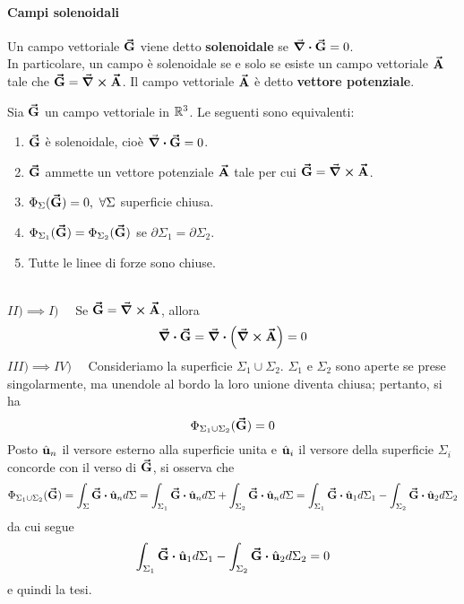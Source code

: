 \paragraph{Campi solenoidali}\label{CampoSolenoidale}
\begin{define}
	Un campo vettoriale $\vb*{\va{G}}$ viene detto \textbf{solenoidale} se $\div{\vb*{\va{G}}}=0$.\\
	In particolare, un campo è solenoidale se e solo se esiste un campo vettoriale $\vb*{\va{A}}$ tale che $\vb*{\va{G}}=\curl{\vb*{\va{A}}}$. Il campo vettoriale $\vb*{\va{A}}$ è detto \textbf{vettore potenziale}.
\end{define}
\begin{theorema}
	Sia $\vb*{\va{G}}$ un campo vettoriale in $\mathbb{R}^3$. Le seguenti sono equivalenti:
	\begin{enumerate}[label=\roman*)]
		\item $\vb*{\va{G}}$ è solenoidale, cioè $\div{\vb*{\va{G}}}=0$.
		\item $\vb*{\va{G}}$ ammette un vettore potenziale $\vb*{\va{A}}$ tale per cui $\vb*{\va{G}}=\curl{\vb*{\va{A}}}$.
		\item $\Phi_{\Sigma}(\vb*{\va{G}})=0,\ \forall \Sigma$ superficie chiusa.
		\item $\Phi_{\Sigma_1}(\vb*{\va{G}})=\Phi_{\Sigma_2}(\vb*{\va{G}})$ se $\partial\Sigma_1=\partial\Sigma_2$.
		\item Tutte le linee di forze sono chiuse.
	\end{enumerate}
\end{theorema}
\begin{demonstration}~\\%
	$II)\implies I)\quad$ Se $\vb*{\va{G}}=\curl{\vb*{\va{A}}}$, allora
	\begin{equation*}
		\div{\vb*{\va{G}}}=\div{\left(\curl{\vb*{\va{A}}}\right)}=0
	\end{equation*}
	$III) \implies IV)\quad$ Consideriamo la superficie $\Sigma_1\cup\Sigma_2$. $\Sigma_1$ e $\Sigma_2$ sono aperte se prese singolarmente, ma unendole al bordo la loro unione diventa chiusa; pertanto, si ha
	\begin{equation*}
		\Phi_{\Sigma_1\cup\Sigma_2}(\vb*{\va{G}})=0
	\end{equation*}
	Posto $\hat{\mathbf{u}}_n$ il versore esterno alla superficie unita e $\hat{\mathbf{u}}_i$ il versore della superficie $\Sigma_i$ concorde con il verso di $\vb*{\va{G}}$, si osserva che
	\begin{equation*}
		\Phi_{\Sigma_1\cup\Sigma_2}(\vba{G})=\int_{\Sigma}\vba{G}\vdot\vbh{u}_nd\Sigma=\int_{\Sigma_1}\vba{G}\vdot\vbh{u}_nd\Sigma+\int_{\Sigma_2}\vba{G}\vdot\vbh{u}_nd\Sigma=\int_{\Sigma_1}\vba{G}\vdot\vbh{u}_1d\Sigma_1-\int_{\Sigma_2}\vba{G}\vdot\vbh{u}_2d\Sigma_2
	\end{equation*}
da cui segue
\begin{equation*}
	\int_{\Sigma_1}\vba{G}\vdot\vbh{u}_1d\Sigma_1-\int_{\Sigma_2}\vba{G}\vdot\vbh{u}_2d\Sigma_2=0
\end{equation*}
e quindi la tesi.
\end{demonstration}
